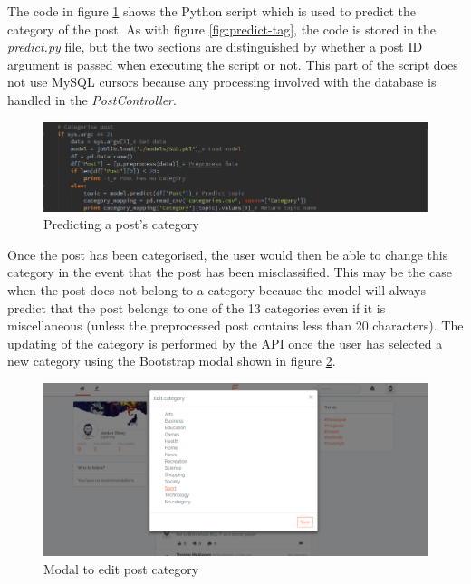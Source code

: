 The code in figure \ref{fig:predict-post} shows the Python script which is used to predict the category of the post. As with figure \ref{fig:predict-tag}, the code is stored in the \emph{predict.py} file, but the two sections are distinguished by whether a post ID argument is passed when executing the script or not. This part of the script does not use MySQL cursors because any processing involved with the database is handled in the \emph{PostController}. 

\begin{figure}[H]
\centering
\includegraphics[width=\textwidth]{Images/Implementation/predict-post}
\caption{Predicting a post's category}
\label{fig:predict-post}
\end{figure}

Once the post has been categorised, the user would then be able to change this category in the event that the post has been misclassified. This may be the case when the post does not belong to a category because the model will always predict that the post belongs to one of the 13 categories even if it is miscellaneous (unless the preprocessed post contains less than 20 characters). The updating of the category is performed by the API once the user has selected a new category using the Bootstrap modal shown in figure \ref{fig:category-modal}. 

\begin{figure}[H]
\centering
\includegraphics[width=\textwidth]{Images/Implementation/category-modal}
\caption{Modal to edit post category}
\label{fig:category-modal}
\end{figure}

